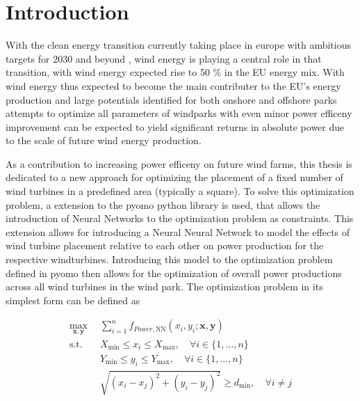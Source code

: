 
\chapter{Introduction}\label{chapter:introduction}


With the clean energy transition currently taking place in europe with ambitious targets for 2030 and beyond \cite{EU_RE_Targets_2023} , wind energy is playing a central role in that transition, with wind energy expected rise to 50 \% in the EU energy mix. \cite{ConsiliumEU_Harnessing_Wind_Power_2024}
With wind energy thus expected to become the main contributer to the EU's energy production and large potentials identified for both onshore and offshore parks \cite{EEA_Wind_Energy_Potential_2009} attempts to optimize all parameters of windparks with even minor power efficeny improvement can be expected to yield significant returns in absolute power due to the scale of future wind energy production. 

As a contribution to increasing power efficeny on future wind farms, this thesis is dedicated to a new approach for optimizing the placement of a fixed number of wind turbines in a predefined area (typically a square). To solve this optimization problem, a extension to the pyomo python library is used, that allows the introduction of Neural Networks to the optimization problem as constraints. \cite{ALCANTARA2023120895} This extension allows for introducing a Neural Neural Network to model the effects of wind turbine placement relative to each other on power production for the respective windturbines. Introducing this model to the optimization problem defined in pyomo then allows for the optimization of overall power productions across all wind turbines in the wind park. The optimization problem in its simplest form can be defined as

\begin{align}
	\max_{\mathbf{x}, \mathbf{y}} & \sum_{i=1}^{n} f_{Power,\text{NN}}(x_i, y_i; \mathbf{x}, \mathbf{y}) \\
	\text{s.t.} \quad & X_{\min} \leq x_i \leq X_{\max}, \quad \forall i \in \{1, \dots, n\} \\
	& Y_{\min} \leq y_i \leq Y_{\max}, \quad \forall i \in \{1, \dots, n\} \\
	& \sqrt{(x_i - x_j)^2 + (y_i - y_j)^2} \geq d_{\min}, \quad \forall i \neq j
\end{align}

